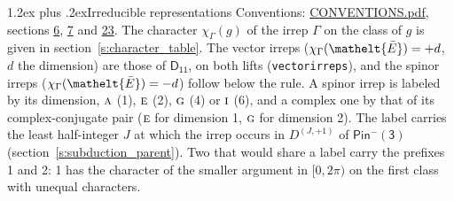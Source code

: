 \documentclass[10pt,a4paper]{article}
\makeatletter
\renewcommand\section{\@startsection{section}{1}{\z@}{-3ex plus -1ex minus -.2ex}%
  {1.2ex plus .2ex}{\normalfont\large\sffamily\bfseries\color{parttitle}}}
\numberwithin{equation}{section}
\newcommand{\eltfont}[1]{{\let\sigma\eltsigma\mathelt{#1}}}
\newcommand{\grp}[1]{\mathsf{#1}}
\newcommand{\irr}[1]{\text{\normalfont\scshape #1}}
\newcommand{\elt}[1]{\eltfont{#1}}
\newcommand{\irrJp}[2]{D^{(#1,#2)}}
\newcommand{\irchar}[1]{\chi_{#1}}
\newcommand{\barred}[1]{\bar{#1}}
\makeatother
\begin{document}
\section{Irreducible representations}\label{s:irreps}
Conventions: \href{../../CONVENTIONS.pdf}{CONVENTIONS.pdf}, sections \href{../../../rotation/CONVENTIONS.pdf\#conv.6}{6}, \href{../../../rotation/CONVENTIONS.pdf\#conv.7}{7} and \href{../../CONVENTIONS.pdf\#conv.23}{23}.
\leavevmode\label{n:function.character}\label{n:irrep.Gamma}The character $\irchar{\Gamma}(g)$ of the irrep $\Gamma$ on the class of $g$ is given in section~\ref{s:character_table}. \label{n:index.dimension}The vector irreps ($\irchar{\Gamma}(\elt{\barred{E}}) = +d$, $d$ the dimension) are those of \href{../../../rotation/data/pdf/D11.pdf}{$\grp{D_{11}}$}, on both lifts (\texttt{vectorirreps}), and the spinor irreps ($\irchar{\Gamma}(\elt{\barred{E}}) = -d$) follow below the rule. A spinor irrep is labeled by its dimension, $\irr{a}$ (1), $\irr{e}$ (2), $\irr{g}$ (4) or $\irr{i}$ (6), and a complex one by that of its complex-conjugate pair ($\irr{e}$ for dimension 1, $\irr{g}$ for dimension 2). The label carries the least half-integer $J$ at which the irrep occurs in $\irrJp{J}{+1}$ of $\grp{Pin^{-}(3)}$ (section~\ref{s:subduction_parent}). Two that would share a label carry the prefixes 1 and 2: 1 has the character of the smaller argument in $[0, 2\pi)$ on the first class with unequal characters.
\end{document}
